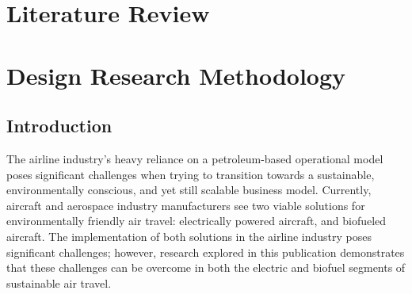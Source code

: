 \documentclass{article}
\begin{document}
\newpage
\section{Literature Review}\label{litRev}
 
 \blindtext
\newpage
\section{Design Research Methodology}\label{designReview}
\subsection{Introduction}\label{designIntro}
The airline industry's heavy reliance on a petroleum-based operational model poses significant challenges when trying to transition towards a sustainable, environmentally conscious, and yet still scalable business model. Currently, aircraft and aerospace industry manufacturers see two viable solutions for environmentally friendly air travel: electrically powered aircraft, and biofueled aircraft. The implementation of both solutions in the airline industry poses significant challenges; however, research explored in this publication demonstrates that these challenges can be overcome in both the electric and biofuel segments of sustainable air travel.\par
\end{document}
